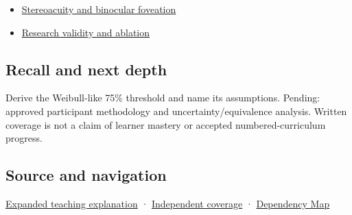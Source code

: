 \begin{itemize}
\tightlist
\item
  \hyperref[appendix-8dc848f14052]{Stereoacuity and binocular foveation}
\item
  \hyperref[appendix-65788587ef78]{Research validity and ablation}
\end{itemize}

\subsection{Recall and next depth}\label{appendix-1759f03e8ce7-recall-and-next-depth}

\hypertarget{appendix-1759f03e8ce7-recall-and-next-depth}{}

Derive the Weibull-like 75\% threshold and name its assumptions. Pending: approved participant methodology and uncertainty/equivalence analysis. Written coverage is not a claim of learner mastery or accepted numbered-curriculum progress.

\subsection{Source and navigation}\label{appendix-1759f03e8ce7-source-and-navigation}

\hypertarget{appendix-1759f03e8ce7-source-and-navigation}{}

\hyperref[04-visual-computing-ii-ch042-a-threshold-is-evidence-from-a-procedure-not-a-universal-border]{Expanded teaching explanation} · \hyperref[appendix-fd090d982a15-xr01---independent-seeing-and-representation-source]{Independent coverage} · \hyperref[appendix-4ad47bdd269a]{Dependency Map}
